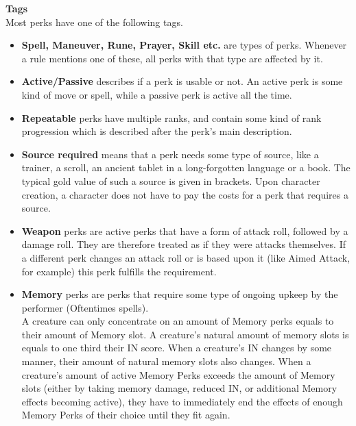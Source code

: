 \textbf{Tags}\\
Most perks have one of the following tags.\\
\begin{itemize}
    \item \textbf{Spell, Maneuver, Rune, Prayer, Skill etc.} are types of perks.
    Whenever a rule mentions one of these, all perks with that type are affected by it.\\
    \item \textbf{Active/Passive} describes if a perk is usable or not.
    An active perk is some kind of move or spell, while a passive perk is active all the time.\\
    \item \textbf{Repeatable} perks have multiple ranks, and contain some kind of rank progression which is described after the perk's main description.\\
    \item \textbf{Source required} means that a perk needs some type of source, like a trainer, a scroll, an ancient tablet in a long-forgotten language or a book.
    The typical gold value of such a source is given in brackets.
    Upon character creation, a character does not have to pay the costs for a perk that requires a source.\\
    \item \textbf{Weapon} perks are active perks that have a form of attack roll, followed by a damage roll.
    They are therefore treated as if they were attacks themselves.
    If a different perk changes an attack roll or is based upon it (like Aimed Attack, for example) this perk fulfills the requirement.\\
    \item \textbf{Memory} perks are perks that require some type of ongoing upkeep by the performer (Oftentimes spells).\\
    A creature can only concentrate on an amount of Memory perks equals to their amount of Memory slot.
    A creature's natural amount of memory slots is equals to one third their IN score.
    When a creature's IN changes by some manner, their amount of natural memory slots also changes.
    When a creature's amount of active Memory Perks exceeds the amount of Memory slots (either by taking memory damage, reduced IN, or additional Memory effects becoming active), they have to immediately end the effects of enough Memory Perks of their choice until they fit again.
\end{itemize}

